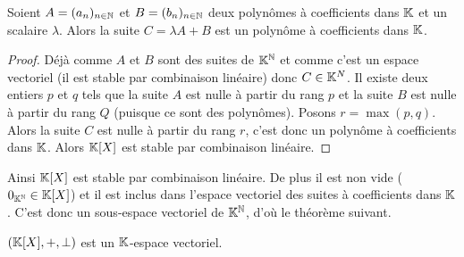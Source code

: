 \begin{lemme}
  Soient \(A=(a_n)_{n \in \mathbb{N}}\) et \(B=(b_n)_{n \in \mathbb{N}}\) deux polynômes à coefficients dans \(\mathbb{K}\) et un scalaire \(\lambda\). Alors la suite \(C=\lambda A+B\) est un polynôme à coefficients dans \(\mathbb{K}\).
\end{lemme}
\begin{proof}
  Déjà comme \(A\) et \(B\) sont des suites de \(\mathbb{K}^{\mathbb{N}}\) et comme c'est un espace vectoriel (il est stable par combinaison linéaire) donc \(C \in \mathbb{K}^N\). Il existe deux entiers \(p\) et \(q\) tels que la suite \(A\) est nulle à partir du rang \(p\) et la suite \(B\) est nulle à partir du rang \(Q\) (puisque ce sont des polynômes). Posons \(r=\max(p,q)\). Alors la suite \(C\) est nulle à partir du rang \(r\), c'est donc un polynôme à coefficients dans \(\mathbb{K}\). Alors \(\mathbb{K}[X]\) est stable par combinaison linéaire. 
\end{proof}

Ainsi \(\mathbb{K}[X]\) est stable par combinaison linéaire. De plus il est non vide (\(0_{\mathbb{K}^{\mathbb{N}}} \in \mathbb{K}[X]\)) et il est inclus dans l'espace vectoriel des suites à coefficients dans \(\mathbb{K}\). C'est donc un sous-espace vectoriel de \(\mathbb{K}^{\mathbb{N}}\), d'où le théorème suivant.

\begin{theo}
  \((\mathbb{K}[X], +, \perp)\) est un \(\mathbb{K}\)-espace vectoriel.
\end{theo}

